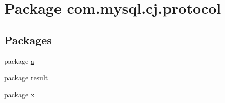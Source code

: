 \hypertarget{namespacecom_1_1mysql_1_1cj_1_1protocol}{}\section{Package com.\+mysql.\+cj.\+protocol}
\label{namespacecom_1_1mysql_1_1cj_1_1protocol}
\subsection*{Packages}
\begin{DoxyCompactItemize}
\item 
package \mbox{\hyperlink{namespacecom_1_1mysql_1_1cj_1_1protocol_1_1a}{a}}
\item 
package \mbox{\hyperlink{namespacecom_1_1mysql_1_1cj_1_1protocol_1_1result}{result}}
\item 
package \mbox{\hyperlink{namespacecom_1_1mysql_1_1cj_1_1protocol_1_1x}{x}}
\end{DoxyCompactItemize}

